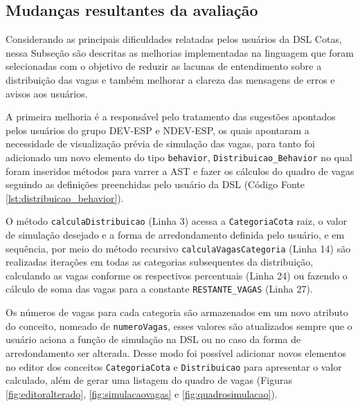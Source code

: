\subsection{Mudanças resultantes da avaliação}
\label{sec:mudanasresultantes}

Considerando as principais dificuldades relatadas pelos usuários da DSL Cotas, nessa Subseção são descritas as melhorias implementadas na linguagem que foram selecionadas com o objetivo de reduzir as lacunas de entendimento sobre a distribuição das vagas e também melhorar a clareza das mensagens de erros e avisos aos usuários.

A primeira melhoria é a responsável pelo tratamento das sugestões apontados pelos usuários do grupo DEV-ESP e NDEV-ESP, os quais apontaram a necessidade de visualização prévia de simulação das vagas, para tanto foi adicionado um novo elemento do tipo \texttt{behavior}, \texttt{Distribuicao\_Behavior} no qual foram inseridos métodos para varrer a \gls{AST} e fazer os cálculos do quadro de vagas seguindo as definições preenchidas pelo usuário da DSL (Código Fonte \ref{lst:distribuicao_behavior}).

\newpage



O método \texttt{calculaDistribuicao} (Linha 3) acessa a \texttt{CategoriaCota} raiz, o valor de simulação desejado e a forma de arredondamento definida pelo usuário, e em sequência, por meio do método recursivo \texttt{calculaVagasCategoria} (Linha 14) são realizadas iterações em todas as categorias subsequentes da distribuição, calculando as vagas conforme os respectivos percentuais (Linha 24) ou fazendo o cálculo de soma das vagas para a constante \texttt{RESTANTE\_VAGAS} (Linha 27). 

Os números de vagas para cada categoria são armazenados em um novo atributo do conceito, nomeado de \texttt{numeroVagas}, esses valores são atualizados sempre que o usuário aciona a função de simulação na DSL ou no caso da forma de arredondamento ser alterada. Desse modo foi possível adicionar novos elementos no editor dos conceitos \texttt{CategoriaCota} e \texttt{Distribuicao} para apresentar o valor calculado, além de gerar uma listagem do quadro de vagas (Figuras \ref{fig:editoralterado}, \ref{fig:simulacaovagas} e \ref{fig:quadrosimulacao}).




